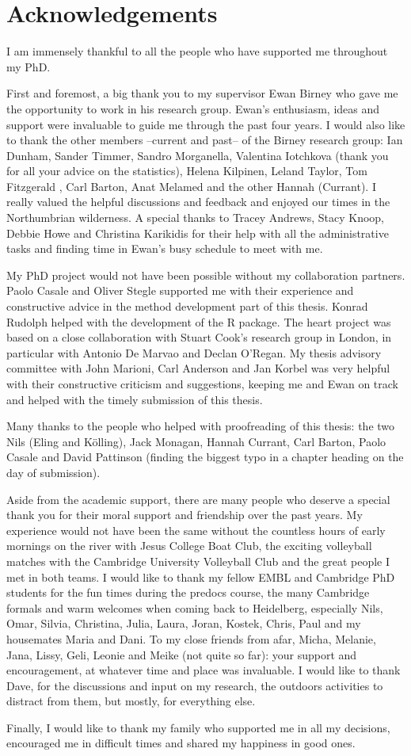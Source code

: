 \documentclass{thesis}
\begin{document}
\chapter*{Acknowledgements}
I am immensely thankful to all the people who have supported me throughout my PhD.

First and foremost, a big thank you to my supervisor Ewan Birney who gave me the opportunity to work in his research group. Ewan's enthusiasm, ideas and support were invaluable to guide me through the past four years. I would also like to thank the other members --current and past-- of the Birney research group: Ian Dunham, Sander Timmer, Sandro Morganella, Valentina Iotchkova (thank you for all your advice on the statistics), Helena Kilpinen, Leland Taylor, Tom Fitzgerald , Carl Barton, Anat Melamed and the other Hannah (Currant). I really valued the helpful discussions and feedback and enjoyed our times in the Northumbrian wilderness. A special thanks to Tracey Andrews, Stacy Knoop, Debbie Howe and Christina Karikidis for their help with all the administrative tasks and finding time in Ewan's busy schedule to meet with me.

My PhD project would not have been possible without my collaboration partners. Paolo Casale and Oliver Stegle supported me with their experience and constructive advice in the method development part of this thesis. Konrad Rudolph helped with the development of the R package. The heart project was based on a close collaboration with Stuart Cook's research group in London, in particular with Antonio De Marvao and Declan O'Regan. My thesis advisory committee with John Marioni, Carl Anderson and Jan Korbel was very helpful with their constructive criticism and suggestions, keeping me and Ewan on track and helped with the timely submission of this thesis. 

Many thanks to the people who helped with proofreading of this thesis: the two Nils (Eling and K\"olling), Jack Monagan, Hannah Currant, Carl Barton, Paolo Casale and David Pattinson (finding the biggest typo in a chapter heading on the day of submission).

Aside from the academic support, there are many people who deserve a special thank you for their moral support and friendship over the past years. My experience would not have been the same without the countless hours of early mornings on the river with Jesus College Boat Club, the exciting volleyball matches with the Cambridge University Volleyball Club and the great people I met in both teams. I would like to thank my fellow EMBL and Cambridge PhD students for the fun times during the predocs course, the many Cambridge formals and warm welcomes when coming back to Heidelberg, especially Nils, Omar, Silvia, Christina, Julia, Laura, Joran, Kostek, Chris, Paul and my housemates Maria and Dani. To my close friends from afar, Micha, Melanie, Jana, Lissy, Geli, Leonie and Meike (not quite so far): your support and encouragement, at whatever time and place was invaluable. I would like to thank Dave, for the discussions and input on my research, the outdoors activities to distract from them, but mostly, for everything else. 

Finally, I would like to thank my family who supported me in all my decisions, encouraged me in difficult times and shared my happiness in good ones. 
\end{document}
